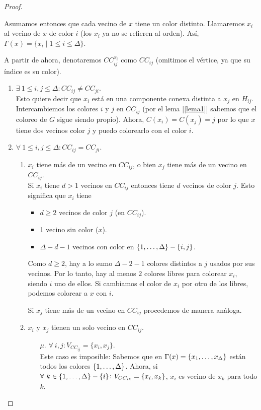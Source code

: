 \begin{proof}
\begin{enumerate}
    Asumamos entonces que cada vecino de $x$ tiene un color distinto. Llamaremos $x_i$ al vecino de $x$ de color $i$ (los $x_i$ ya no se refieren al orden). Así, $\Gamma(x) = \{x_i \mid 1 \le i \le \Delta\}$.

    A partir de ahora, denotaremos $CC^{x_i}_{ij}$ como $CC_{ij}$ (omitimos el vértice, ya que su índice es su color).
    \begin{enumerate}
    \item \label{CCneq} $\exists~ 1 \le i,j \le \Delta \colon CC_{ij} \neq CC_{ji}$.\\
    Esto quiere decir que $x_i$ está en una componente conexa distinta a $x_j$ en $H_{ij}$. Intercambiemos los colores $i$ y $j$ en $CC_{ij}$ (por el lema [\ref{lema1}] sabemos que el coloreo de $G$ sigue siendo propio). Ahora, $C(x_i) = C(x_j) = j$ por lo que $x$ tiene dos vecinos color $j$ y puedo colorearlo con el color $i$.
    
    \item $\forall~ 1 \le i,j \le \Delta \colon CC_{ij} = CC_{ji}$.
    \begin{enumerate}
    \item $x_i$ tiene más de un vecino en $CC_{ij}$, o bien $x_j$ tiene más de un vecino en $CC_{ij}$.\\
    Si $x_i$ tiene $d > 1$ vecinos en $CC_{ij}$ entonces tiene $d$ vecinos de color $j$. Esto significa que $x_i$ tiene
    \begin{itemize}
        \item $d \ge 2$ vecinos de color $j$ (en $CC_{ij}$).
        \item 1 vecino sin color ($x$).
        \item $\Delta - d - 1$ vecinos con color en $\{1, \mathellipsis, \Delta\} - \{i, j\}$.
    \end{itemize}
    Como $d \ge 2$, hay a lo sumo $\Delta - 2 - 1$ colores distintos a $j$ usados por sus vecinos. Por lo tanto, hay al menos $2$ colores libres para colorear $x_i$, siendo $i$ uno de ellos. Si cambiamos el color de $x_i$ por otro de los libres, podemos colorear a $x$ con $i$.
    
    Si $x_j$ tiene más de un vecino en $CC_{ij}$ procedemos de manera análoga.
    
    \item $x_i$ y $x_j$ tienen un solo vecino en $CC_{ij}$.
    \begin{itemize}
        \item [$\mu.$] $\forall~ i,j: V_{CC_{ij}} = \{x_i, x_j\}$.\\
        Este caso es imposible: Sabemos que en $\Gamma(x) = \{x_1, \mathellipsis, x_{\Delta}\}$ están todos los colores $\{1, \mathellipsis, \Delta\}$. Ahora, si $\forall~ k \in \{1, \mathellipsis, \Delta\} - \{i\} \colon V_{CC_{ik}} = \{x_i, x_k\}$, $x_i$ es vecino de $x_k$ para todo $k$.
        

\end{itemize}
\end{enumerate}
\end{enumerate}
\end{enumerate}
\end{proof}
